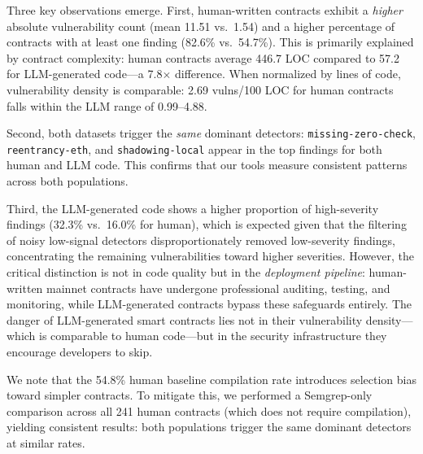 \begin{table}[h]
\caption{Comparison of LLM-generated vs.\ human-written contracts.}
\label{tab:human-baseline}
\centering
{}
\end{table}

Three key observations emerge. First, human-written contracts exhibit a \emph{higher} absolute vulnerability count (mean 11.51 vs.\ 1.54) and a higher percentage of contracts with at least one finding (82.6\% vs.\ 54.7\%). This is primarily explained by contract complexity: human contracts average 446.7 LOC compared to 57.2 for LLM-generated code---a 7.8$\times$ difference. When normalized by lines of code, vulnerability density is comparable: 2.69 vulns/100 LOC for human contracts falls within the LLM range of 0.99--4.88.

Second, both datasets trigger the \emph{same} dominant detectors: \texttt{missing-zero-check}, \texttt{reentrancy-eth}, and \texttt{shadowing-local} appear in the top findings for both human and LLM code. This confirms that our tools measure consistent patterns across both populations.

Third, the LLM-generated code shows a higher proportion of high-severity findings (32.3\% vs.\ 16.0\% for human), which is expected given that the filtering of noisy low-signal detectors disproportionately removed low-severity findings, concentrating the remaining vulnerabilities toward higher severities. However, the critical distinction is not in code quality but in the \emph{deployment pipeline}: human-written mainnet contracts have undergone professional auditing, testing, and monitoring, while LLM-generated contracts bypass these safeguards entirely. The danger of LLM-generated smart contracts lies not in their vulnerability density---which is comparable to human code---but in the security infrastructure they encourage developers to skip.

We note that the 54.8\% human baseline compilation rate introduces selection bias toward simpler contracts. To mitigate this, we performed a Semgrep-only comparison across all 241 human contracts (which does not require compilation), yielding consistent results: both populations trigger the same dominant detectors at similar rates.

